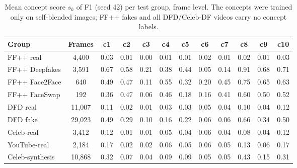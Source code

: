 \begin{table}[t]
\centering
\footnotesize
\setlength{\tabcolsep}{4pt}
\caption{Mean concept score $s_k$ of F1 (seed 42) per test group, frame level. The concepts were trained only on self-blended images; FF++ fakes and all DFD/Celeb-DF videos carry no concept labels.}
\label{tab:bymethod}
\begin{tabular}{lccccccccccc}
\toprule
Group & Frames & c1 & c2 & c3 & c4 & c5 & c6 & c7 & c8 & c9 & c10 \\
\midrule
FF++ real & 4,400 & 0.03 & 0.01 & 0.00 & 0.01 & 0.01 & 0.02 & 0.01 & 0.02 & 0.01 & 0.03 \\
FF++ Deepfakes & 3,591 & 0.67 & 0.58 & 0.21 & 0.38 & 0.44 & 0.05 & 0.14 & 0.91 & 0.68 & 0.71 \\
FF++ Face2Face & 640 & 0.49 & 0.47 & 0.11 & 0.55 & 0.32 & 0.20 & 0.45 & 0.75 & 0.65 & 0.63 \\
FF++ FaceSwap & 192 & 0.36 & 0.47 & 0.06 & 0.46 & 0.18 & 0.16 & 0.41 & 0.60 & 0.50 & 0.52 \\
\midrule
DFD real & 11,007 & 0.11 & 0.02 & 0.01 & 0.03 & 0.03 & 0.05 & 0.04 & 0.10 & 0.04 & 0.12 \\
DFD fake & 29,023 & 0.49 & 0.29 & 0.10 & 0.16 & 0.22 & 0.06 & 0.06 & 0.66 & 0.34 & 0.50 \\
\midrule
Celeb-real & 3,412 & 0.12 & 0.01 & 0.01 & 0.05 & 0.04 & 0.06 & 0.04 & 0.08 & 0.04 & 0.12 \\
YouTube-real & 2,184 & 0.17 & 0.02 & 0.02 & 0.06 & 0.05 & 0.06 & 0.05 & 0.13 & 0.06 & 0.17 \\
Celeb-synthesis & 10,868 & 0.32 & 0.07 & 0.04 & 0.09 & 0.09 & 0.05 & 0.05 & 0.43 & 0.15 & 0.31 \\
\bottomrule
\end{tabular}
\end{table}
